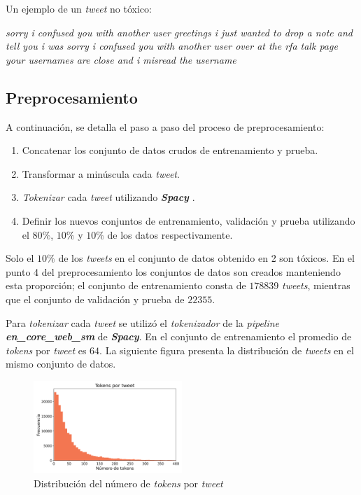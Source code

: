 Un ejemplo de un \textit{tweet} no tóxico:

\textit{sorry i confused you with another user greetings i just wanted to drop a note and tell you i was sorry i confused you with another user over at the rfa talk page your usernames are close and i misread the username}

\subsection{Preprocesamiento}

A continuación, se detalla el paso a paso del proceso de preprocesamiento:

\begin{enumerate}[topsep=0pt,itemsep=0ex]
	\item Concatenar los conjunto de datos crudos de entrenamiento y prueba.
	\item Transformar a minúscula cada \textit{tweet}.
	\item \textit{Tokenizar} cada \textit{tweet} utilizando \textbf{\textit{Spacy}} \cite{Honnibal_spaCy_Industrial-strength_Natural_2020}.
	\item Definir los nuevos conjuntos de entrenamiento, validación y prueba utilizando el $80\%$, $10\%$ y $10\%$ de los datos respectivamente.
\end{enumerate}

Solo el $10\%$ de los \textit{tweets} en el conjunto de datos obtenido en 2 son tóxicos. En el punto 4 del preprocesamiento los conjuntos de datos son creados manteniendo esta proporción; el conjunto de entrenamiento consta de $178839$ \textit{tweets}, mientras que el conjunto de validación y prueba de $22355$.

Para \textit{tokenizar} cada \textit{tweet} se utilizó el \textit{tokenizador} de la \textit{pipeline} \textbf{\textit{en\_core\_web\_sm}} de \textbf{\textit{Spacy}}. En el conjunto de entrenamiento el promedio de \textit{tokens} por \textit{tweet} es $64$. La siguiente figura presenta la distribución de \textit{tweets} en el mismo conjunto de datos.

\begin{figure}[h]
\centering
\includegraphics[width=0.5\textwidth]{tokens}
\caption{\label{fig:tokens} Distribución del número de \textit{tokens} por \textit{tweet}}
\end{figure}

